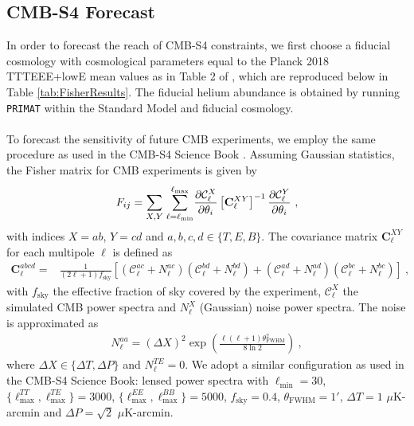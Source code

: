 \documentclass[notitlepage,letterpaper,natbib,aps,prd,onecolumn,amsmath,amsfonts,nofootinbib,preprintnumbers,superscriptaddress,secnumarabic,groupedaddress]{revtex4-1}
\begin{document}
\cleardoublepage

\subsection{CMB-S4 Forecast}
\label{app:CMBfisher}
In order to forecast the reach of CMB-S4 constraints, we first choose a fiducial cosmology with cosmological parameters equal to the Planck 2018 TTTEEE+lowE mean values as in Table 2 of \cite{Aghanim:2018eyx}, which are reproduced below in Table \ref{tab:FisherResults}.
The fiducial helium abundance is obtained by running \texttt{PRIMAT} within the Standard Model and fiducial cosmology.\\\\
\noindent To forecast the sensitivity of future CMB experiments, we employ the same procedure as used in the CMB-S4 Science Book \cite{Abazajian:2016yjj}. Assuming Gaussian statistics, the Fisher matrix for CMB experiments is given by
\begin{align}
    F_{ij} = \underset{X,Y}{\sum}\hspace{0.1 cm}\overset{\ell_\mathrm{max}}{\underset{\ell=\ell_\mathrm{min}}{\sum}}\frac{\partial\mathcal{C}_\ell^X}{\partial\theta_i}\left[\mathbf{C}_\ell^{XY}\right]^{-1}\frac{\partial\mathcal{C}_\ell^Y}{\partial\theta_i}\ ,
\end{align}
with indices $X = ab$, $Y = cd$ and $a,b,c,d\in\{T,E,B\}$. 
The covariance matrix $\mathbf{C}_\ell^{XY}$ for each multipole $\ell$ is defined as
\begin{align}
    \mathbf{C}_\ell^{abcd} =& \frac{1}{(2\ell+1)f_\mathrm{sky}}\left[\left(\mathcal{C}_\ell^{ac}+N_\ell^{ac}\right)\left(\mathcal{C}_\ell^{bd}+N_\ell^{bd}\right)
    + \left(\mathcal{C}_\ell^{ad}+N_\ell^{ad}\right)\left(\mathcal{C}_\ell^{bc}+N_\ell^{bc}\right)\right]\ ,
\end{align}
with $f_\mathrm{sky}$ the effective fraction of sky covered by the experiment, $\mathcal{C}_\ell^X$ the simulated CMB power spectra and $N_\ell^X$ (Gaussian) noise power spectra. The noise is approximated as
\begin{align}
    N_\ell^{aa} = (\Delta X)^2\exp\left(\frac{\ell(\ell+1)\theta^2_\mathrm{FWHM}}{8\ln2}\right)\ ,
\end{align}
where $\Delta X \in \{\Delta T,\Delta P\}$ and $N_\ell^{TE} = 0$.
We adopt a similar configuration as used in the CMB-S4 Science Book: lensed power spectra with $\ell_\mathrm{min} = 30$, $\{\ell_\mathrm{max}^{TT}, \ell_\mathrm{max}^{TE}\} = 3000$, $\{\ell_\mathrm{max}^{EE},\ell_\mathrm{max}^{BB}\} = 5000$, $f_\mathrm{sky} = 0.4$, $\theta_\mathrm{FWHM} = 1'$, $\Delta T = 1$ $\mu$K-arcmin and $\Delta P = \sqrt{2}$ $\mu$K-arcmin.\\\\
\end{document}
